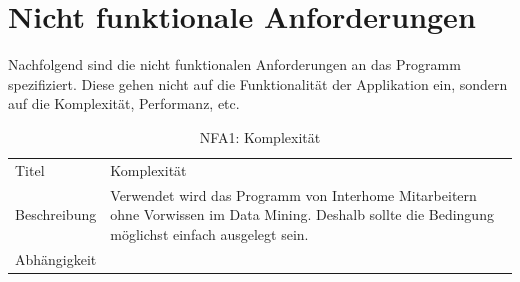 \section{Nicht funktionale Anforderungen}
\label{sec:anforderungsanalyse:nichtfunktionaleanforderung}
Nachfolgend sind die nicht funktionalen Anforderungen an das Programm spezifiziert. Diese gehen nicht auf die Funktionalität der Applikation ein, sondern auf die Komplexität, Performanz, etc.


\begin{table}[H] 
	\caption{NFA1: Komplexität}
	\centering
	\label{fig:anforderungsanalyse:nichtfunktionaleanforderung:nfa1}
	\begin{tabular}{ | l | L{10cm} | } 
		\hline 
		 \\ \hline 
		Titel & Komplexität \\ \hline 
		Beschreibung & Verwendet wird das Programm von Interhome Mitarbeitern ohne Vorwissen im Data Mining. Deshalb sollte die Bedingung möglichst einfach ausgelegt sein. \\ \hline 
		Abhängigkeit & \\ \hline 
	\end{tabular}
\end{table}

